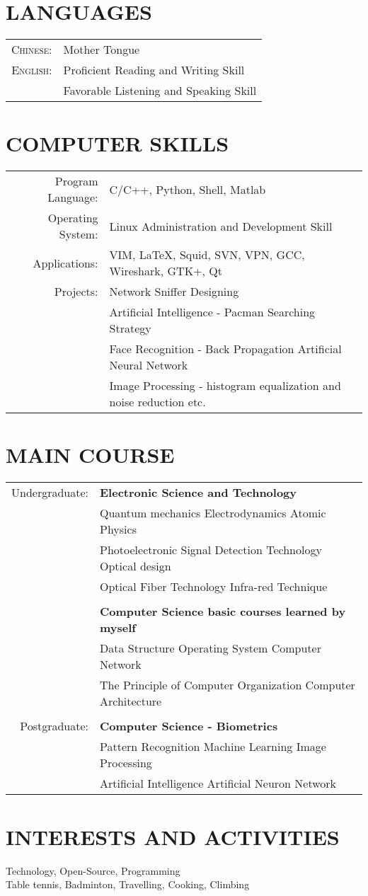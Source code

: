 \documentclass[a4paper,10pt]{article}
\begin{document}
\section{LANGUAGES}
\begin{tabular}{rl}
 \textsc{Chinese:}&Mother Tongue\\
 \textsc{English:}&Proficient Reading and Writing Skill\\
 & Favorable Listening and Speaking Skill\\
\end{tabular}

\section{COMPUTER SKILLS}
\begin{tabular}{rl}
 Program Language: & C/C++, Python, Shell, Matlab \\
 Operating System: & Linux Administration and Development Skill\\
 Applications: & VIM, \LaTeX, Squid,
    SVN, VPN, GCC, Wireshark, GTK+, Qt\\
 Projects: & Network Sniffer Designing\\
 & Artificial Intelligence - Pacman Searching Strategy \\
 & Face Recognition - Back Propagation Artificial Neural Network \\
 & Image Processing - histogram equalization and noise reduction etc.
\end{tabular}

\section{MAIN COURSE}
\begin{tabular}{rl}
    Undergraduate: & \bf{Electronic Science and Technology} \\
    & Quantum mechanics \textbar{} Electrodynamics \textbar{} Atomic Physics \\
    & Photoelectronic Signal Detection Technology \textbar{} Optical design\\
    & Optical Fiber Technology \textbar{} Infra-red Technique \\ & \\
    & \bf{Computer Science basic courses learned by myself} \\
    & Data Structure \textbar{} Operating System \textbar{} Computer Network \\
    & The Principle of Computer Organization \textbar{} Computer Architecture
    \\ & \\
    Postgraduate: & \bf{Computer Science - Biometrics}\\ 
    & Pattern Recognition \textbar{} Machine Learning \textbar{} Image Processing \\
    & Artificial Intelligence \textbar{} Artificial Neuron Network \\
\end{tabular}


\section{INTERESTS AND ACTIVITIES}
Technology, Open-Source, Programming\\
Table tennis, Badminton, Travelling, Cooking, Climbing
\end{document}
